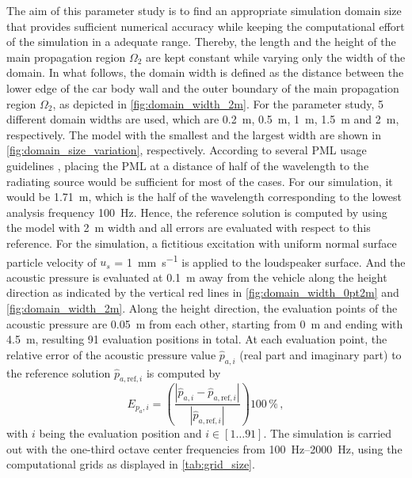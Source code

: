 The aim of this parameter study is to find an appropriate simulation domain size that provides sufficient numerical accuracy while keeping the computational effort of the simulation in a adequate range. Thereby, the length and the height of the main propagation region $\Omega_2$ are kept constant while varying only the width of the domain. In what follows, the domain width is defined as the distance between the lower edge of the car body wall and the outer boundary of the main propagation region $\Omega_2$, as depicted in \cref{fig:domain_width_2m}. For the parameter study, 5 different domain widths are used, which are \SI{0.2}{\meter}, \SI{0.5}{\meter}, \SI{1}{\meter}, \SI{1.5}{\meter} and \SI{2}{\meter}, respectively. The model with the smallest and the largest width are shown in \cref{fig:domain_size_variation}, respectively. According to several PML usage guidelines \cite{PML_3ds, PML_comsol, PML_quickwave}, placing the PML at a distance of half of the wavelength to the radiating source would be sufficient for most of the cases. For our simulation, it would be \SI{1.71}{\meter}, which is the half of the wavelength corresponding to the lowest analysis frequency \SI{100}{\hertz}. Hence, the reference solution is computed by using the model with \SI{2}{\meter} width and all errors are evaluated with respect to this reference. For the simulation, a fictitious excitation with uniform normal surface particle velocity of $u_s$ = \SI{1}{\milli\meter\per\second} is applied to the loudspeaker surface. And the acoustic pressure is evaluated at \SI{0.1}{\meter} away from the vehicle along the height direction as indicated by the vertical red lines in \cref{fig:domain_width_0pt2m} and \cref{fig:domain_width_2m}. Along the height direction, the evaluation points of the acoustic pressure are \SI{0.05}{\meter} from each other, starting from \SI{0}{\meter} and ending with \SI{4.5}{\meter}, resulting 91 evaluation positions in total. At each evaluation point, the relative error of the acoustic pressure value $\hat{p}_{a,i}$ (real part and imaginary part) to the reference solution $\hat{p}_{a,\text{ref},i}$ is computed by
\begin{equation}
	E_{p_a,i} = \left(\frac{\left| \hat{p}_{a,i} - \hat{p}_{a,\text{ref},i} \right|}{\left|\hat{p}_{a,\text{ref},i}\right|}\right)100\,\% \,,
\end{equation}
with $i$ being the evaluation position and $i \in \left[1\dots91\right]$. The simulation is carried out with the one-third octave center frequencies from \SIrange{100}{2000}{\hertz}, using the computational grids as displayed in \cref{tab:grid_size}.

